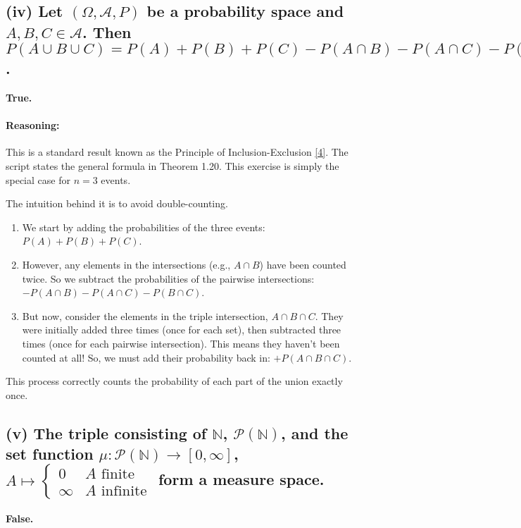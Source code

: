 \documentclass[11pt,a4paper]{article}
\begin{document}
\subsection*{(iv) Let $(\Omega, \mathcal{A}, P)$ be a probability space and $A, B, C \in \mathcal{A}$. Then $P(A \cup B \cup C) = P(A) + P(B) + P(C) - P(A \cap B) - P(A \cap C) - P(B \cap C) + P(A \cap B \cap C)$.}

\textbf{True.}

\paragraph{Reasoning:}
This is a standard result known as the Principle of Inclusion-Exclusion \hyperlink{note4}{[4]}. The script states the general formula in Theorem 1.20. This exercise is simply the special case for $n=3$ events.

The intuition behind it is to avoid double-counting.
\begin{enumerate}
    \item We start by adding the probabilities of the three events: $P(A) + P(B) + P(C)$.
    \item However, any elements in the intersections (e.g., $A \cap B$) have been counted twice. So we subtract the probabilities of the pairwise intersections: $-P(A \cap B) - P(A \cap C) - P(B \cap C)$.
    \item But now, consider the elements in the triple intersection, $A \cap B \cap C$. They were initially added three times (once for each set), then subtracted three times (once for each pairwise intersection). This means they haven't been counted at all! So, we must add their probability back in: $+P(A \cap B \cap C)$.
\end{enumerate}
This process correctly counts the probability of each part of the union exactly once.

\subsection*{(v) The triple consisting of $\mathbb{N}$, $\mathcal{P}(\mathbb{N})$, and the set function $\mu: \mathcal{P}(\mathbb{N}) \to [0, \infty]$, $A \mapsto \begin{cases} 0 & A \text{ finite} \\ \infty & A \text{ infinite} \end{cases}$ form a measure space.}

\textbf{False.}
\end{document}
